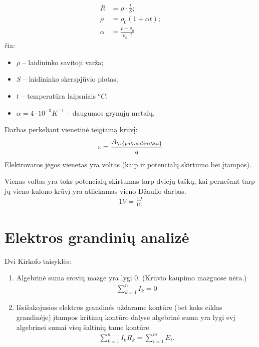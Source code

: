\begin{defn}[Varža]
  \begin{align*}
    R &= \rho \cdot \frac{l}{S}; \\
    \rho &= \rho_{0} (1 + \alpha t); \\
    \alpha &= \frac{\rho - \rho_{0}}{\rho_{0} \cdot t}
  \end{align*}
  čia:
  \begin{itemize}
    \item $\rho$ – laidininko savitoji varža;
    \item $S$ – laidininko skerspjūvio plotas;
    \item $t$ – temperatūra laipsniais ${}^{o}C$;
    \item $\alpha = 4 \cdot 10^{-3} K^{-1}$ – daugumos grynųjų metalų.
  \end{itemize}
\end{defn}


\begin{defn}
  Darbas perkeliant vienetinė teigiamą krūvį:
  \begin{equation*}
    \varepsilon = \frac{A_{\t{pašalinių}}}{q}
  \end{equation*}
  Elektrovaros jėgos vienetas yra voltas (kaip ir potencialų skirtumo
  bei įtampos).
\end{defn}

\begin{defn}
  Vienas voltas yra toks potencialų skirtumas tarp dviejų taškų, kai
  pernešant tarp jų vieno kulono krūvį yra atliekamas vieno Džaulio
  darbas.
  \begin{align*}
    1 V = \frac{1J}{1C}
  \end{align*}
\end{defn}

\section{Elektros grandinių analizė}

Dvi Kirkofo taisyklės:
\begin{enumerate}
  \item Algebrinė suma srovių mazge yra lygi 0. (Krūvio kaupimo mazguose
    nėra.)
    \begin{align*}
      \sum ^{n} _{k=1} I_{k} = 0
    \end{align*}
  \item Išsišakojusios elektros grandinės uždarame kontūre (bet koks ciklas 
    grandinėje) įtampos kritimų kontūro dalyse algebrinė suma yra
    lygi evj algebrinei sumai visų šaltinių tame kontūre.
    \begin{align*}
      \sum _{k=1} ^{n} I_{k} R_{k} = \sum _{i=1} ^{m} E_{i}.
    \end{align*}
\end{enumerate}

